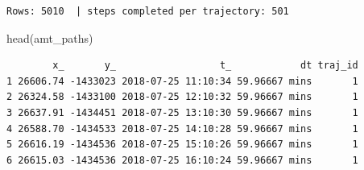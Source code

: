 \documentclass[
  letterpaper,
  DIV=11,
  numbers=noendperiod]{scrartcl}
\newenvironment{Shaded}{\begin{snugshade}}{\end{snugshade}}
\newcommand{\FunctionTok}[1]{\textcolor[rgb]{0.28,0.35,0.67}{#1}}
\newcommand{\NormalTok}[1]{\textcolor[rgb]{0.00,0.23,0.31}{#1}}
\begin{document}
\begin{verbatim}
Rows: 5010  | steps completed per trajectory: 501 
\end{verbatim}

\begin{Shaded}
\begin{Highlighting}[]
\FunctionTok{head}\NormalTok{(amt\_paths)}
\end{Highlighting}
\end{Shaded}

\begin{verbatim}
        x_       y_                  t_            dt traj_id
1 26606.74 -1433023 2018-07-25 11:10:34 59.96667 mins       1
2 26324.58 -1433100 2018-07-25 12:10:32 59.96667 mins       1
3 26637.91 -1434451 2018-07-25 13:10:30 59.96667 mins       1
4 26588.70 -1434533 2018-07-25 14:10:28 59.96667 mins       1
5 26616.19 -1434536 2018-07-25 15:10:26 59.96667 mins       1
6 26615.03 -1434536 2018-07-25 16:10:24 59.96667 mins       1
\end{verbatim}
\end{document}
